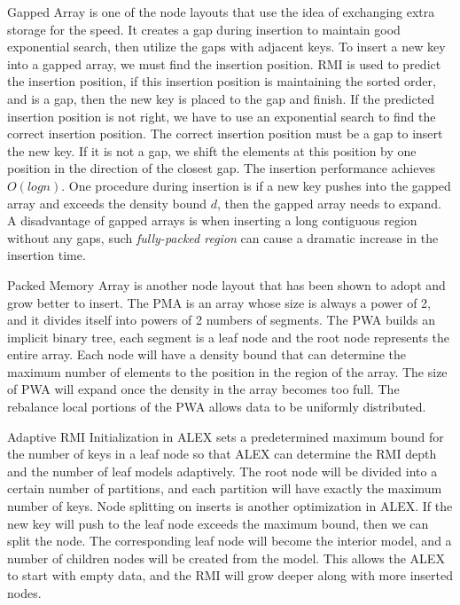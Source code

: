 Gapped Array is one of the node layouts that use the idea of exchanging extra storage for the speed. It creates a gap during insertion to maintain good exponential search, then utilize the gaps with adjacent keys. To insert a new key into a gapped array, we must find the insertion position. RMI is used to predict the insertion position, if this insertion position is maintaining the sorted order, and is a gap, then the new key is placed to the gap and finish. If the predicted insertion position is not right, we have to use an exponential search to find the correct insertion position. The correct insertion position must be a gap to insert the new key. If it is not a gap, we shift the elements at this position by one position in the direction of the closest gap. The insertion performance achieves ${O(logn)}$. One procedure during insertion is if a new key pushes into the gapped array and exceeds the density bound ${d}$, then the gapped array needs to expand. A disadvantage of gapped arrays is when inserting a long contiguous region without any gaps, such \emph{fully-packed region} can cause a dramatic increase in the insertion time. 

Packed Memory Array is another node layout that has been shown to adopt and grow better to insert. The PMA is an array whose size is always a power of 2, and it divides itself into powers of 2 numbers of segments. The PWA builds an implicit binary tree, each segment is a leaf node and the root node represents the entire array.  Each node will have a density bound that can determine the maximum number of elements to the position in the region of the array. The size of PWA will expand once the density in the array becomes too full. The rebalance local portions of the PWA allows data to be uniformly distributed. 

Adaptive RMI Initialization in ALEX sets a predetermined maximum bound for the number of keys in a leaf node so that ALEX can determine the RMI depth and the number of leaf models adaptively. The root node will be divided into a certain number of partitions, and each partition will have exactly the maximum number of keys. Node splitting on inserts is another optimization in ALEX. If the new key will push to the leaf node exceeds the maximum bound, then we can split the node. The corresponding leaf node will become the interior model, and a number of children nodes will be created from the model. This allows the ALEX to start with empty data, and the RMI will grow deeper along with more inserted nodes.


